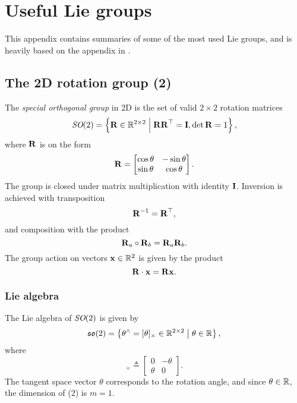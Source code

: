 \chapter{Useful Lie groups} \label{ch:useful-lie-groups}
This appendix contains summaries of some of the most used Lie groups, and is heavily based on the appendix in \cite{SolaARobotics}.

\section{The 2D rotation group \SO(2)} \label{sec:SO2_group}
The \emph{special orthogonal group} in 2D is the set of valid $2 \times 2$ rotation matrices
\begin{equation}
  \textit{SO}(2) = \left \{ {\boldsymbol{\mathbf{R}}} \in {\mathbb R}^{2 \times 2} \;\middle|\; {\boldsymbol{\mathbf{R}}}{\boldsymbol{\mathbf{R}}}^{\top} = {\boldsymbol{\mathbf{I}}}, \det {\boldsymbol{\mathbf{R}}} = 1 \right \},
\end{equation}
where ${\boldsymbol{\mathbf{R}}}$ is on the form
\begin{equation}
  {\boldsymbol{\mathbf{R}}} = 
  \begin{bmatrix}
    \cos \theta & -\sin \theta \\
    \sin \theta & \cos \theta
  \end{bmatrix}.
\end{equation}
The group is closed under matrix multiplication with identity ${\boldsymbol{\mathbf{I}}}$.
Inversion is achieved with transposition
\begin{equation}
  {\boldsymbol{\mathbf{R}}}^{-1} = {\boldsymbol{\mathbf{R}}}^{\top},
\end{equation}
and composition with the product
\begin{equation}
  {\boldsymbol{\mathbf{R}}}_a \circ {\boldsymbol{\mathbf{R}}}_b = {\boldsymbol{\mathbf{R}}}_a {\boldsymbol{\mathbf{R}}}_b.
\end{equation}
The group action on vectors ${\boldsymbol{\mathbf{x}}} \in {\mathbb R}^2$ is given by the product
\begin{equation} \label{eq:SO2-group-action}
  {\boldsymbol{\mathbf{R}}} \cdot {\boldsymbol{\mathbf{x}}} = {\boldsymbol{\mathbf{R}}} {\boldsymbol{\mathbf{x}}}.
\end{equation}

\subsection{Lie algebra}
The Lie algebra of $\textit{SO}(2)$ is given by
\begin{equation}
  {\mathfrak {so}}(2) = \left \{ \theta^\wedge = [\theta]_\times \in {\mathbb R}^{2 \times 2} \;\middle|\; \theta \in {\mathbb R} \right \},
\end{equation}
where
\begin{equation}
  [\theta]_\times \triangleq
  \begin{bmatrix}
    0 & -\theta \\
    \theta & 0
  \end{bmatrix}.
\end{equation}
The tangent space vector $\theta$ corresponds to the rotation angle, and since $\theta \in {\mathbb R}$, the dimension of \SO(2) is $m = 1$.

